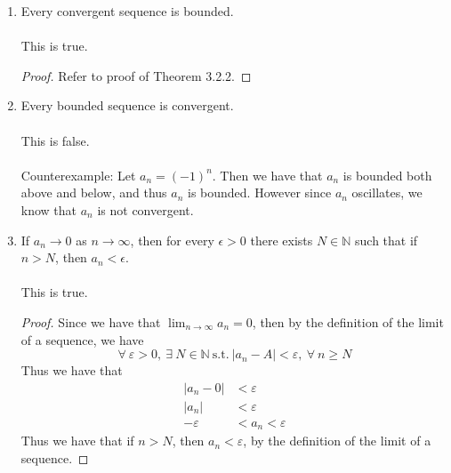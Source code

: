 \documentclass[12pt,letterpaper]{article}
\newcommand{\st}{\ \text{s.t.}\ }
\newcommand{\N}{\mathbb{N}}
\theoremstyle{case}
\begin{document}
\begin{enumerate}
\begin{enumerate}
		\item Every convergent sequence is bounded.
		\\\\This is true.
		\begin{proof}
			Refer to proof of Theorem 3.2.2.
		\end{proof}
		
		\item Every bounded sequence is convergent.
		\\\\This is false.
		\\\\Counterexample: Let $a_n = (-1)^n$. Then we have that $a_n$ is bounded both above and below, and thus $a_n$ is bounded. However since $a_n$ oscillates, we know that $a_n$ is not convergent. 
		
		\item If $a_n \rightarrow 0$ as $n \rightarrow \infty$, then for every $\epsilon > 0$ there exists $N \in \mathbb{N}$ such that if $n >N$, then $a_n < \epsilon$.
		\\\\This is true.
		\begin{proof}
			Since we have that $\lim_{n\to\infty} a_n = 0$, then by the definition of the limit of a sequence, we have
			\[\forall\ \varepsilon > 0,\ \exists\ N \in \N \st |a_n-A|<\varepsilon,\ \forall\ n \geq N\]
			Thus we have that
			\begin{align*}
				|a_n-0| &<\varepsilon
				\\ |a_n| &< \varepsilon
				\\ -\varepsilon &< a_n < \varepsilon
			\end{align*}
			Thus we have that if $n > N$, then $a_n < \varepsilon$, by the definition of the limit of a sequence.
		\end{proof}
		

\end{enumerate}
\end{enumerate}
\end{document}
